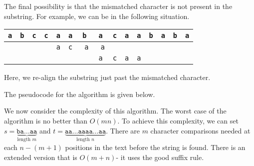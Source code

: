 \documentclass[a4paper, openany]{memoir}
\begin{document}
The final possibility is that the mismatched character is not present in the substring. For example, we can be in the following situation.
\begin{table}[H]
    \centering
    \begin{tabular}{ccccccccccccccc}
        \texttt{a} &\texttt{b} & \texttt{c} &\texttt{c} & \texttt{a} & \texttt{a} & \texttt{b} & \texttt{a} & \texttt{c} & \texttt{a} & \texttt{a} & \texttt{b} & \texttt{a} & \texttt{b} & \texttt{a} \\
        \hline
        & & & & \texttt{a} & \texttt{c} & \texttt{\color{red} a} & \texttt{\color{brown} a} \\
        & & & & & & & \texttt{a} & \texttt{c} & \texttt{a} & \texttt{a} 
    \end{tabular}
\end{table}
\noindent Here, we re-align the substring just past the mismatched character.

The pseudocode for the algorithm is given below.


We now consider the complexity of this algorithm. The worst case of the algorithm is no better than $O(mn)$. To achieve this complexity, we can set $s = \underbrace{\texttt{ba} \dots \texttt{aa}}_{\text{length } m}$ and $t = \underbrace{\texttt{aa} \dots \texttt{aaaa} \dots \texttt{aa}}_{\text{length } n}$. There are $m$ character comparisons needed at each $n - (m+1)$ positions in the text before the string is found. There is an extended version that is $O(m+n)$- it uses the good suffix rule.
\end{document}
